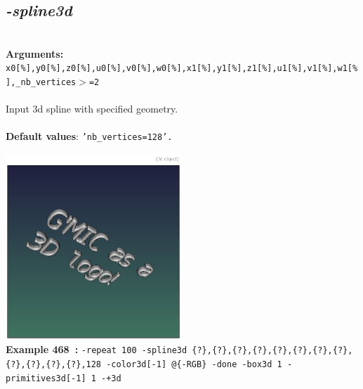 \documentclass[a4paper,11pt,twoside]{book}
\begin{document}
\subsection{\emph{-spline3d} }\vspace*{-0.5em}
~\\\textbf{Arguments: } 
{\small \texttt{x0[\%],y0[\%],z0[\%],u0[\%],v0[\%],w0[\%],x1[\%],y1[\%],z1[\%],u1[\%],v1[\%],w1[\%],\_nb\_vertices$>$=2}}\\~\\
Input 3d spline with specified geometry.
~\\~\\\textbf{Default values}: {\small \texttt{'nb\_vertices=128'.}}
\begin{center}\includegraphics[keepaspectratio=true,height=7cm,width=\textwidth]{img/gmic_def468.jpg}\\
{\footnotesize \textbf{Example 468~:} \texttt{-repeat 100 -spline3d \{?\},\{?\},\{?\},\{?\},\{?\},\{?\},\{?\},\{?\},\{?\},\{?\},\{?\},\{?\},128 -color3d[-1] @\{-RGB\} -done -box3d 1 -primitives3d[-1] 1 -+3d}}
\end{center}
\end{document}
